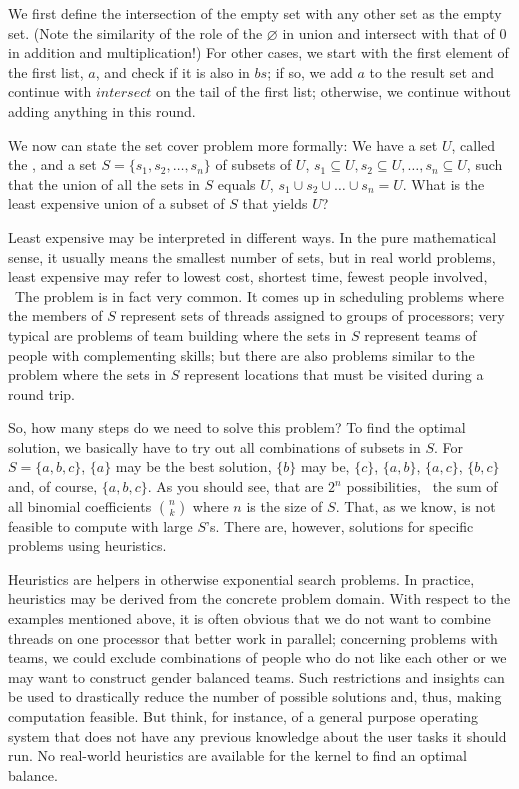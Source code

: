 \documentclass{scrreprt}
\begin{document}
We first define the intersection of the empty set
with any other set as the empty set.
(Note the similarity of the role of the $\varnothing$ 
 in union and intersect with that of $0$ in 
 addition and multiplication!)
For other cases, we start with the first element of the first list, $a$,
and check if it is also in $bs$;
if so, we add $a$ to the result set
and continue with $intersect$ on the tail of the first list;
otherwise, we continue
without adding anything
in this round. 

We now can state the set cover problem more formally:
We have a set $U$, called the ,
and a set $S = \lbrace s_1,s_2, \dots, s_n\rbrace$ 
of subsets of $U$, 
$s_1 \subseteq U, s_2 \subseteq U, \dots, s_n \subseteq U$,
such that the union of all the sets in $S$ equals $U$,
$s_1 \cup s_2 \cup \dots \cup s_n = U$.
What is the least expensive union of a subset of $S$
that yields $U$?

Least expensive may be interpreted in different ways.
In the pure mathematical sense,
it usually means the smallest number of sets,
but in real world problems,
least expensive may refer to lowest cost,
shortest time, fewest people involved, \etc\
The problem is in fact very common.
It comes up in scheduling problems
where the members of $S$
represent sets of threads assigned
to groups of processors;
very typical are problems of
team building where the sets in $S$
represent teams of people with complementing skills;
but there are also problems 
similar to the 
problem where the sets in $S$ 
represent locations that must be visited 
during a round trip.

So, how many steps do we need to solve this problem?
To find the optimal solution,
we basically have to try out
all combinations of subsets in $S$.
For $S = \lbrace a,b,c\rbrace$,
$\lbrace a\rbrace$ may be the best solution,
$\lbrace b\rbrace$ may be,
$\lbrace c\rbrace$,
$\lbrace a,b\rbrace$,
$\lbrace a,c\rbrace$, 
$\lbrace b,c\rbrace$ and, of course,
$\lbrace a,b,c\rbrace$.
As you should see,
that are $2^n$ possibilities,
\ie\ the sum of all binomial coefficients $\binom{n}{k}$
where $n$ is the size of $S$.
That, as we know, is not feasible to compute
with large $S$'s.
There are, however, solutions for specific problems
using heuristics.

Heuristics are helpers in otherwise exponential
search problems.
In practice, heuristics may be derived from the concrete
problem domain.
With respect to the examples mentioned above,
it is often obvious that we do 
not want to combine threads on one processor
that better work in parallel;
concerning problems with teams,
we could exclude combinations of people
who do not like each other
or we may want to construct gender balanced teams. 
Such restrictions and insights
can be used to drastically reduce 
the number of possible solutions
and, thus, making computation feasible.
But think, for instance,
of a general purpose operating system
that does not have any previous knowledge
about the user tasks it should run.
No real-world heuristics are available
for the kernel to find an optimal balance.
\end{document}
